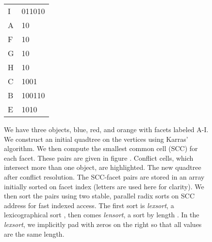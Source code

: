 \documentclass[submission]{gmp2017}
\begin{document}
\begin{figure}
{\begin{minipage}{0.24\columnwidth}
\begin{tabular}{|l|l|}
      I & 011010 \\
      A & 10 \\
      F & 10 \\
      G & 10 \\
      H & 10 \\
      C & 1001 \\
      B & 100110 \\
      E & 1010 \\
      \hline
    \end{tabular}
  \end{minipage} }
  \caption{
    \protect{} We have three objects, blue, red, and orange with facets labeled A-I.
    \protect{} We construct an initial quadtree on the vertices using Karras' algorithm.
    \protect{} We then compute the smallest common cell (SCC) for each facet. These pairs are given in figure \protect{}.
    \protect{} Conflict cells, which intersect more than one object, are highlighted.
    \protect{} The new quadtree after conflict resolution.
    \protect{} The SCC-facet pairs are stored in an array initially sorted on facet index (letters are used here for clarity). We then sort the pairs using two stable, parallel radix sorts on SCC address for fast indexed access.
    The first sort is \textit{lexsort}, a lexicographical sort \protect{},
    then comes \textit{lensort}, a sort by length \protect{}. In the \textit{lexsort}, we implicitly pad with zeros on the right so that all values are the same length. 
  }
  \label{fig:conflict-find}
\end{figure}
\end{document}
